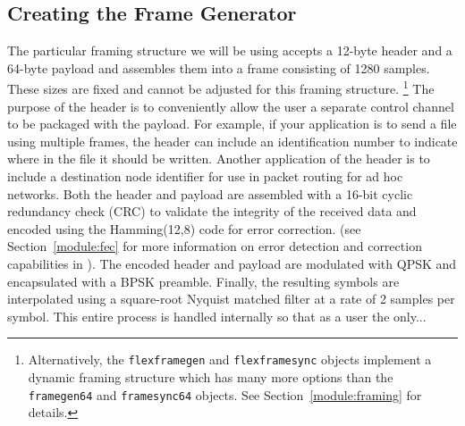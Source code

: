 \subsection{Creating the Frame Generator}
\label{tutorial:framing:framegen}
The particular framing structure we will be using accepts a 12-byte
header and a 64-byte payload and assembles them into a frame
consisting of 1280 samples.
These sizes are fixed and cannot be adjusted for this framing
structure.%
\footnote{
    Alternatively, the {\tt flexframegen} and {\tt flexframesync}
    objects implement a dynamic framing structure which has many more
    options than the {\tt framegen64} and {\tt framesync64} objects.
    See Section~\ref{module:framing} for details.}
The purpose of the header is to conveniently allow the user a separate
control channel to be packaged with the payload.
For example, if your application is to send a file using multiple
frames, the header can include an identification number to indicate
where in the file it should be written.
Another application of the header is to include a destination node
identifier for use in packet routing for ad hoc networks.
Both the header and payload are assembled with a 16-bit cyclic
redundancy check (CRC) to validate the integrity of the received data
and encoded using the Hamming(12,8) code for error correction.
(see Section~\ref{module:fec} for more information on error detection
and correction capabilities in \liquid).
The encoded header and payload are modulated with QPSK and encapsulated
with a BPSK preamble.
Finally, the resulting symbols are interpolated using a square-root
Nyquist matched filter at a rate of 2 samples per symbol.
This entire process is handled internally so that as a user the only...

